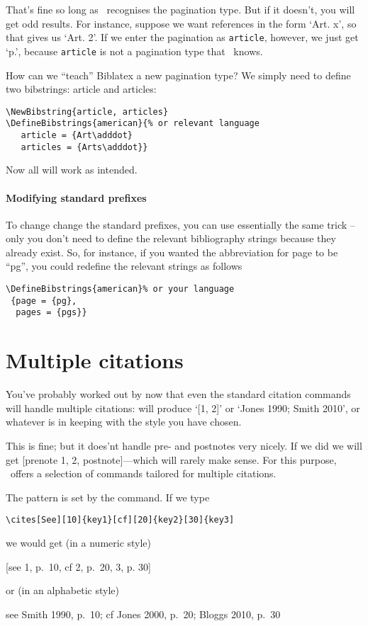 That’s fine so long as \biblatex\ recognises the pagination type. But if
it doesn’t, you will get odd results. For instance, suppose we want
references in the form `Art. x', so that  gives us
`Art. 2'. If we enter the pagination as \texttt{article}, however, we
just get `p.', because \texttt{article} is not a
pagination type that \biblatex\ knows.

How can we “teach” Biblatex a new pagination type? We simply need to
define two bibstrings: article and articles:

\begin{verbatim}
\NewBibstring{article, articles}
\DefineBibstrings{american}{% or relevant language
   article = {Art\adddot}
   articles = {Arts\adddot}}
\end{verbatim}
Now all will work as intended. 

\paragraph{Modifying standard prefixes} To change change the standard
prefixes, you can use essentially the same trick -- only you don't
need to define the relevant bibliography strings because they already exist. So, for instance, if you wanted the abbreviation for page
to be “pg”, you could redefine the relevant strings as follows

\begin{verbatim}
\DefineBibstrings{american}% or your language
 {page = {pg},
  pages = {pgs}}
\end{verbatim}

\section{Multiple citations}

You've probably worked out by now that even the standard citation
commands will handle multiple citations:  will
produce `[1, 2]' or `Jones 1990; Smith 2010', or whatever is in
keeping with the style you have chosen.

This is fine; but it does'nt handle pre- and postnotes very
nicely. If we did  we will
get [prenote 1, 2, postnote]---which will rarely make sense. For this
purpose, \biblatex\ offers a selection of commands tailored for
multiple citations.

The pattern is set by the  command. If we type
\begin{center}
\verb|\cites[See][10]{key1}[cf][20]{key2}[30]{key3]|
\end{center}
we would get (in a numeric style)
\begin{center}
[see 1, p.\ 10, cf 2, p.\ 20, 3, p. 30]
\end{center}
or (in an alphabetic style)
\begin{center}
see Smith 1990, p.\ 10; cf Jones 2000, p.\ 20; Bloggs 2010, p.\ 30
\end{center}

